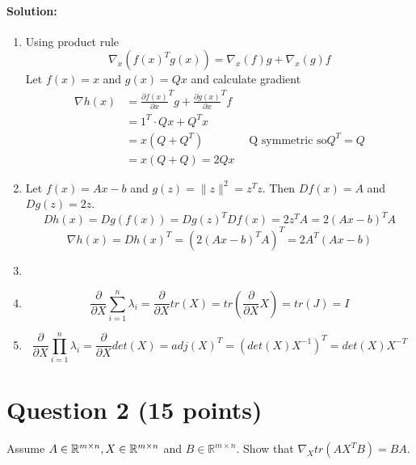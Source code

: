 \documentclass[
	10pt, %
]{../fphw}
\begin{document}
	\paragraph{Solution:}
	\begin{enumerate}
		\item Using product rule
		\begin{equation*}
			\nabla_x (f(x)^Tg(x)) = \nabla_x(f)g + \nabla_x(g) f
		\end{equation*}
		Let $f(x) = x$ and $g(x) = Qx$ and calculate gradient
		\begin{align*}
			\nabla h(x) &= \frac{\partial f(x)}{\partial x}^T g + \frac{\partial g(x)}{\partial x}^T f \\
			&= 1^T\cdot Qx + Q^T x \\
			&= x(Q+Q^T) \qquad\qquad\text{Q symmetric so} Q^T=Q\\
			&= x(Q+Q) = 2Qx
		\end{align*}
		\item Let $f(x) = Ax-b $ and $g(z) = \|z\|^2 = z^Tz$. Then $Df(x) = A$ and $Dg(z) = 2z$.
		\begin{equation*}
			Dh(x) = Dg(f(x)) = Dg(z)^TDf(x) = 2z^T A = 2(Ax-b)^TA
		\end{equation*}
		\begin{equation*}
			\nabla h(x) = Dh(x)^T = (2(Ax-b)^TA)^T = 2A^T(Ax-b)
		\end{equation*}
		\item  %
		\item 
		\begin{equation*}
		\frac{\partial}{\partial X}\sum_{i=1}^{n}\lambda_i = \frac{\partial}{\partial X}tr(X) = tr(\frac{\partial}{\partial X} X) = tr(J) = I
		\end{equation*}
		\item
		\begin{equation*}
		\frac{\partial}{\partial X}\prod_{i=1}^{n}\lambda_i = \frac{\partial}{\partial X}det(X) = adj(X)^T = (det(X)X^{-1})^T = det(X)X^{-T}
		\end{equation*}
		
	\end{enumerate}

	\section*{Question 2 (15 points)}
	\begin{problem}
		Assume $A\in\mathbb{R}^{m\times n},\space X\in\mathbb{R}^{m\times n}$ and $B\in\mathbb{R}^{m\times n}$. Show that $\nabla_X tr(AX^TB) = BA$.
	\end{problem}
\end{document}
